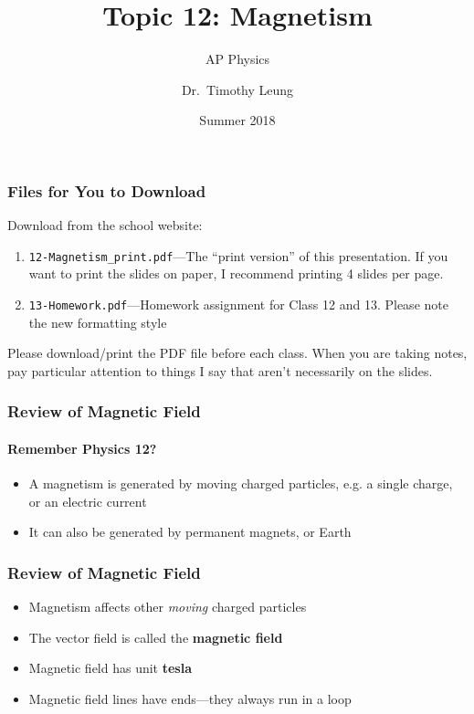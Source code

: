 \documentclass[12pt,aspectratio=169]{beamer}
\title{Topic 12: Magnetism}
\subtitle{AP Physics}
\author[TML]{Dr.\ Timothy Leung}
\institute{Olympiads School}
\date{Summer 2018}
\newcommand{\mb}[1]{\mathbf{#1}}
\begin{document}
\begin{frame}
  \maketitle
\end{frame}



\begin{frame}
  \frametitle{Files for You to Download}
  Download from the school website:
  \begin{enumerate}
  \item\texttt{12-Magnetism\_print.pdf}---The ``print version'' of this
    presentation. If you want to print the slides on paper, I recommend
    printing 4 slides per page.
  \item\texttt{13-Homework.pdf}---Homework assignment for Class 12 and 13.
    Please note the new formatting style
  \end{enumerate}

  \vspace{.2in}Please download/print the PDF file before each class. When you
  are taking notes, pay particular attention to things I say that aren't
  necessarily on the slides.
\end{frame}


\begin{frame}
  \frametitle{Review of Magnetic Field}
  \framesubtitle{Remember Physics 12?}
  \begin{itemize}
  \item A magnetism is generated by moving charged particles, e.g.
    a single charge, or an electric current
  \item It can also be generated by permanent magnets, or Earth
  \end{itemize}
\end{frame}

\begin{frame}
  \frametitle{Review of Magnetic Field}
  \begin{itemize}
  \item Magnetism affects other \emph{moving} charged particles
  \item The vector field is called the \textbf{magnetic field}
  \item Magnetic field has unit \textbf{tesla}
  \item Magnetic field lines have ends---they always run in a loop
  \end{itemize}
\end{frame}
\end{document}
